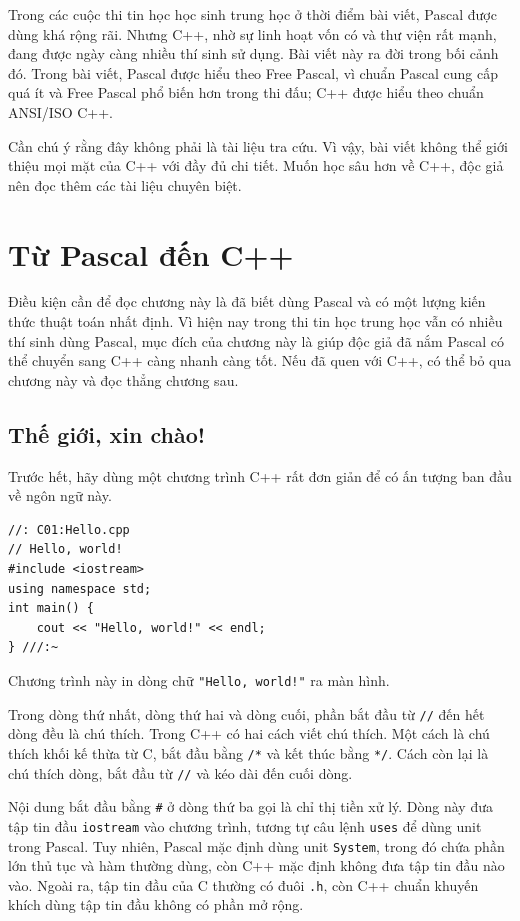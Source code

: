 \documentclass[11pt]{article}
\newcommand{\cpp}{C++}
\newcommand{\pascal}{Pascal}
\begin{document}
Trong các cuộc thi tin học học sinh trung học ở thời điểm bài viết, \pascal{}
được dùng khá rộng rãi. Nhưng \cpp{}, nhờ sự linh hoạt vốn có và thư viện rất
mạnh, đang được ngày càng nhiều thí sinh sử dụng. Bài viết này ra đời trong
bối cảnh đó. Trong bài viết, \pascal{} được hiểu theo Free Pascal, vì chuẩn
\pascal{} cung cấp quá ít và Free Pascal phổ biến hơn trong thi đấu; \cpp{}
được hiểu theo chuẩn ANSI/ISO \cpp{}.

Cần chú ý rằng đây không phải là tài liệu tra cứu. Vì vậy, bài viết không thể
giới thiệu mọi mặt của \cpp{} với đầy đủ chi tiết. Muốn học sâu hơn về
\cpp{}, độc giả nên đọc thêm các tài liệu chuyên biệt.

\section{Từ \pascal{} đến \cpp{}}

Điều kiện cần để đọc chương này là đã biết dùng \pascal{} và có một lượng
kiến thức thuật toán nhất định. Vì hiện nay trong thi tin học trung học vẫn có
nhiều thí sinh dùng \pascal{}, mục đích của chương này là giúp độc giả đã nắm
\pascal{} có thể chuyển sang \cpp{} càng nhanh càng tốt. Nếu đã quen với
\cpp{}, có thể bỏ qua chương này và đọc thẳng chương sau.

\subsection{Thế giới, xin chào!}

Trước hết, hãy dùng một chương trình \cpp{} rất đơn giản để có ấn tượng ban
đầu về ngôn ngữ này.

\begin{verbatim}
//: C01:Hello.cpp
// Hello, world!
#include <iostream>
using namespace std;
int main() {
    cout << "Hello, world!" << endl;
} ///:~
\end{verbatim}

Chương trình này in dòng chữ \verb|"Hello, world!"| ra màn hình.

Trong dòng thứ nhất, dòng thứ hai và dòng cuối, phần bắt đầu từ \verb|//| đến
hết dòng đều là chú thích. Trong \cpp{} có hai cách viết chú thích. Một cách
là chú thích khối kế thừa từ C, bắt đầu bằng \verb|/*| và kết thúc bằng
\verb|*/|. Cách còn lại là chú thích dòng, bắt đầu từ \verb|//| và kéo dài
đến cuối dòng.

Nội dung bắt đầu bằng \verb|#| ở dòng thứ ba gọi là chỉ thị tiền xử lý. Dòng
này đưa tập tin đầu \verb|iostream| vào chương trình, tương tự câu lệnh
\verb|uses| để dùng unit trong \pascal{}. Tuy nhiên, \pascal{} mặc định dùng
unit \verb|System|, trong đó chứa phần lớn thủ tục và hàm thường dùng, còn
\cpp{} mặc định không đưa tập tin đầu nào vào. Ngoài ra, tập tin đầu của C
thường có đuôi \verb|.h|, còn \cpp{} chuẩn khuyến khích dùng tập tin đầu
không có phần mở rộng.
\end{document}
